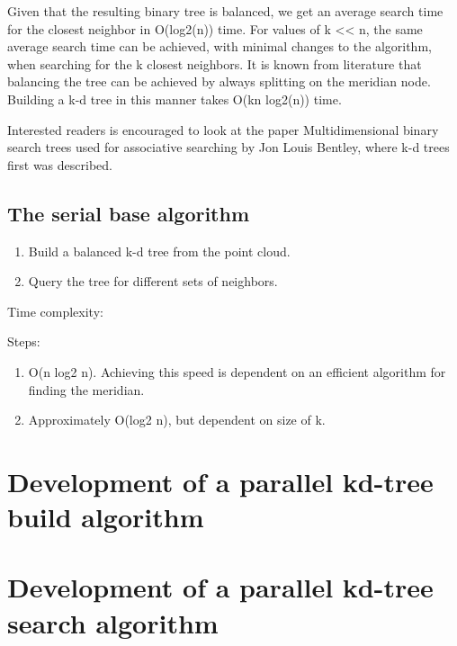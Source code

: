 Given that the resulting binary tree is balanced, we get an average search time for the closest neighbor in O(log2(n)) time. For values of k << n, the same average search time can be achieved, with minimal changes to the algorithm, when searching for the k closest neighbors. It is known from literature that balancing the tree can be achieved by always splitting on the meridian node. Building a k-d tree in this manner takes O(kn log2(n)) time.

Interested readers is encouraged to look at the paper Multidimensional binary search trees used for associative searching by Jon Louis Bentley, where k-d trees first was described.



\subsection{The serial base algorithm} %
\label{ssub:the_serial_base_algorithm}

\begin{enumerate}
    \item Build a balanced k-d tree from the point cloud.
    \item Query the tree for different sets of neighbors.
\end{enumerate}

Time complexity:

Steps:
\begin{enumerate}
    \item O(n log2 n). Achieving this speed is dependent on an efficient algorithm for finding the meridian.
    \item Approximately O(log2 n), but dependent on size of k.
\end{enumerate}


\section{Development of a parallel kd-tree build algorithm} %
\label{sub:development_of_a_parallel_kd_tree_build_algorithm}


\section{Development of a parallel kd-tree search algorithm} %
\label{sub:development_of_a_parallel_kd_tree_search_algorithm}

